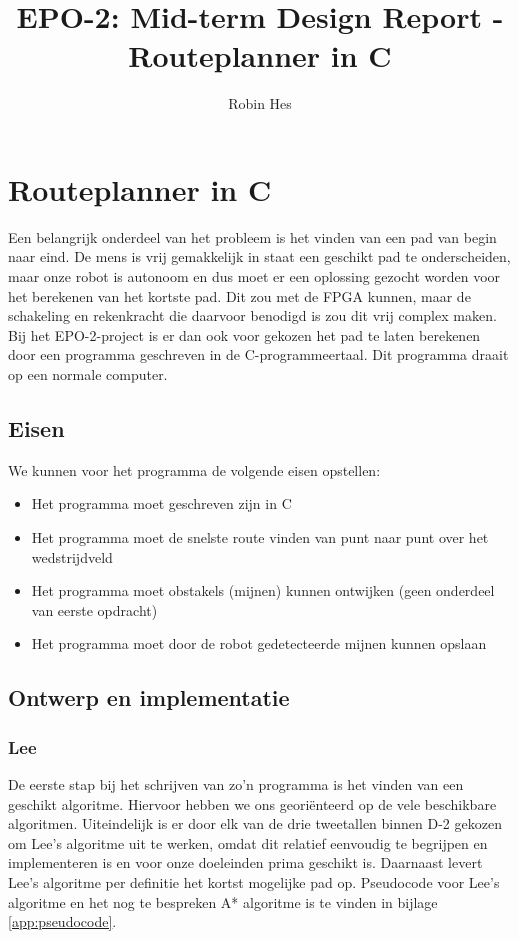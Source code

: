 \documentclass{report}
\title{EPO-2: Mid-term Design Report - Routeplanner in C}
\author{Robin Hes}
\begin{document}
\chapter{Routeplanner in C}
\label{ch:route}

Een belangrijk onderdeel van het probleem is het vinden van een pad van begin naar eind.
De mens is vrij gemakkelijk in staat een geschikt pad te onderscheiden, maar onze robot is autonoom en dus moet er een oplossing gezocht worden voor het berekenen van het kortste pad.
Dit zou met de FPGA kunnen, maar de schakeling en rekenkracht die daarvoor benodigd is zou dit vrij complex maken.
Bij het EPO-2-project is er dan ook voor gekozen het pad te laten berekenen door een programma geschreven in de C-programmeertaal.
Dit programma draait op een normale computer.

\section{Eisen}
\label{route-eisen}

We kunnen voor het programma de volgende eisen opstellen:

\begin{itemize}
	\item Het programma moet geschreven zijn in C
	\item Het programma moet de snelste route vinden van punt naar punt over het wedstrijdveld
	\item Het programma moet obstakels (mijnen) kunnen ontwijken (geen onderdeel van eerste opdracht)
	\item Het programma moet door de robot gedetecteerde mijnen kunnen opslaan
\end{itemize}

\section{Ontwerp en implementatie}
\label{sec:ontwerp-impl}

\subsection{Lee}
\label{ssec:lee}

De eerste stap bij het schrijven van zo'n programma is het vinden van een geschikt algoritme.
Hiervoor hebben we ons georiënteerd op de vele beschikbare algoritmen.
Uiteindelijk is er door elk van de drie tweetallen binnen D-2 gekozen om Lee's algoritme uit te werken, omdat dit relatief eenvoudig te begrijpen en implementeren is en voor onze doeleinden prima geschikt is.
Daarnaast levert Lee's algoritme per definitie het kortst mogelijke pad op.
Pseudocode voor Lee's algoritme en het nog te bespreken A* algoritme is te vinden in bijlage \ref{app:pseudocode}.
\end{document}
